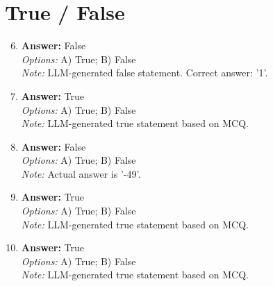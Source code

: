 \documentclass[12pt]{article}
\begin{document}
\section*{True / False}
\begin{enumerate}[label=\arabic*.]
\setcounter{enumi}{5}
\item \textbf{Answer:} False
\\ \textit{Options:} A) True; B) False
\\ \textit{Note:} LLM-generated false statement. Correct answer: '1'.
\item \textbf{Answer:} True
\\ \textit{Options:} A) True; B) False
\\ \textit{Note:} LLM-generated true statement based on MCQ.
\item \textbf{Answer:} False
\\ \textit{Options:} A) True; B) False
\\ \textit{Note:} Actual answer is '-49'.
\item \textbf{Answer:} True
\\ \textit{Options:} A) True; B) False
\\ \textit{Note:} LLM-generated true statement based on MCQ.
\item \textbf{Answer:} True
\\ \textit{Options:} A) True; B) False
\\ \textit{Note:} LLM-generated true statement based on MCQ.
\end{enumerate}
\end{document}
